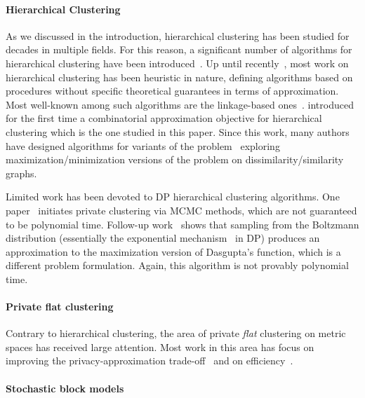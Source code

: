 \paragraph{Hierarchical Clustering}
As we discussed in the introduction, hierarchical clustering has been studied for decades in multiple fields. For this reason, a significant number of algorithms for hierarchical clustering have been introduced~\citep{murtagh2012algorithms}. Up until recently~\citep{dasgupta2016cost}, most work on hierarchical clustering has been heuristic in nature, defining algorithms based on procedures without specific theoretical guarantees in terms of approximation. Most well-known among such algorithms are the linkage-based ones~\citep{J10,bateni2017affinity}. \citet{dasgupta2016cost} introduced for the first time a combinatorial approximation objective for hierarchical clustering which is the one studied in this paper. Since this work, many authors have designed algorithms for variants of the problem~\citep{cohen2017hierarchical,cohen2019hierarchical, charikar2017approximate,moseley2017approximation, agarwal2022sublinear,chatziafratis2020bisect} exploring maximization/minimization versions of the problem on dissimilarity/similarity graphs.

Limited work has been devoted to DP hierarchical clustering algorithms. One paper~\citep{xiao2014differentially} initiates private clustering via MCMC methods, which are not guaranteed to be polynomial time. Follow-up work~\citep{Kolluri_CCS21} shows that sampling from the Boltzmann distribution (essentially the exponential mechanism~\citep{mcsherry2007mechanism} in DP) produces an approximation to the maximization version of Dasgupta's function, which is a different problem formulation. Again, this algorithm is not provably polynomial time.

\paragraph{Private flat clustering}
Contrary to hierarchical clustering, the area of private {\it flat} clustering on metric spaces has received large attention. Most work in this area has focus on improving the privacy-approximation trade-off~\citep{ghazi2020differentially,balcan2017differentially} and on efficiency~\citep{hegde2021sok,cohennear,cohen2022scalable}.

\paragraph{Stochastic block models}

